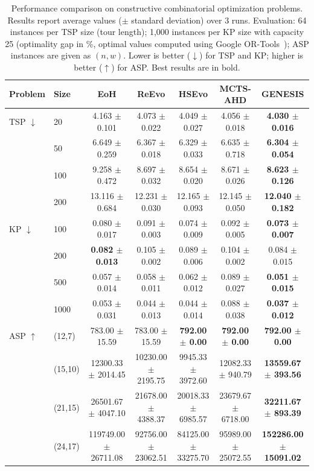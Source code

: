 \documentclass[sigconf,anonymous]{aamas}
\begin{document}
\begin{table}[!tp]
\centering
\small
\caption{
Performance comparison on constructive combinatorial optimization problems.
Results report average values ($\pm$ standard deviation) over 3 runs. Evaluation: 64 instances per TSP size (tour length); 1,000 instances per KP size with capacity 25 (optimality gap in \%, optimal values computed using Google OR-Tools~\cite{ortools}); ASP instances are given as $(n,w)$.
Lower is better ($\downarrow$) for TSP and KP; higher is better ($\uparrow$) for ASP. Best results are in bold.
}
\label{tab:constructive_merged}

\begin{tabular*}{\textwidth}{@{\extracolsep{\fill}}llccccc@{}}
\toprule
Problem & Size & EoH & ReEvo & HSEvo & MCTS-AHD & GENESIS \\
\midrule
TSP $\downarrow$ & 20  & 4.163 $\pm$ 0.101 & 4.073 $\pm$ 0.022 & 4.049 $\pm$ 0.027 & 4.056 $\pm$ 0.018 & \textbf{4.030 $\pm$ 0.016} \\
                 & 50  & 6.649 $\pm$ 0.259 & 6.367 $\pm$ 0.018 & 6.329 $\pm$ 0.033 & 6.635 $\pm$ 0.718 & \textbf{6.304 $\pm$ 0.054} \\
                 & 100 & 9.258 $\pm$ 0.472 & 8.697 $\pm$ 0.032 & 8.654 $\pm$ 0.020 & 8.671 $\pm$ 0.026 & \textbf{8.623 $\pm$ 0.126} \\
                 & 200 & 13.116 $\pm$ 0.684 & 12.231 $\pm$ 0.030 & 12.165 $\pm$ 0.093 & 12.145 $\pm$ 0.050 & \textbf{12.040 $\pm$ 0.182} \\
\midrule
KP $\downarrow$ & 100  & 0.080 $\pm$ 0.017 & 0.091 $\pm$ 0.003 & 0.074 $\pm$ 0.009 & 0.092 $\pm$ 0.005 & \textbf{0.073 $\pm$ 0.007} \\
                & 200  & \textbf{0.082 $\pm$ 0.013} & 0.105 $\pm$ 0.002 & 0.089 $\pm$ 0.006 & 0.104 $\pm$ 0.002 & 0.084 $\pm$ 0.015 \\
                & 500  & 0.057 $\pm$ 0.014 & 0.058 $\pm$ 0.011 & 0.062 $\pm$ 0.012 & 0.089 $\pm$ 0.027 & \textbf{0.051 $\pm$ 0.015} \\
                & 1000 & 0.053 $\pm$ 0.031 & 0.044 $\pm$ 0.013 & 0.044 $\pm$ 0.014 & 0.088 $\pm$ 0.038 & \textbf{0.037 $\pm$ 0.012} \\
\midrule
ASP $\uparrow$ & (12,7)  & 783.00 $\pm$ 15.59 & 783.00 $\pm$ 15.59 & \textbf{792.00 $\pm$ 0.00} & \textbf{792.00 $\pm$ 0.00} & \textbf{792.00 $\pm$ 0.00} \\
               & (15,10) & 12300.33 $\pm$ 2014.45 & 10230.00 $\pm$ 2195.75 & 9945.33 $\pm$ 3972.60 & 12082.33 $\pm$ 940.79 & \textbf{13559.67 $\pm$ 393.56} \\
               & (21,15) & 26501.67 $\pm$ 4047.10 & 21678.00 $\pm$ 4388.37 & 20018.33 $\pm$ 6985.57 & 23679.67 $\pm$ 6718.00 & \textbf{32211.67 $\pm$ 893.39} \\
               & (24,17) & 119749.00 $\pm$ 26711.08 & 92756.00 $\pm$ 23062.51 & 84125.00 $\pm$ 33275.70 & 95989.00 $\pm$ 25072.55 & \textbf{152286.00 $\pm$ 15091.02} \\
\bottomrule
\end{tabular*}
\end{table}
\end{document}
